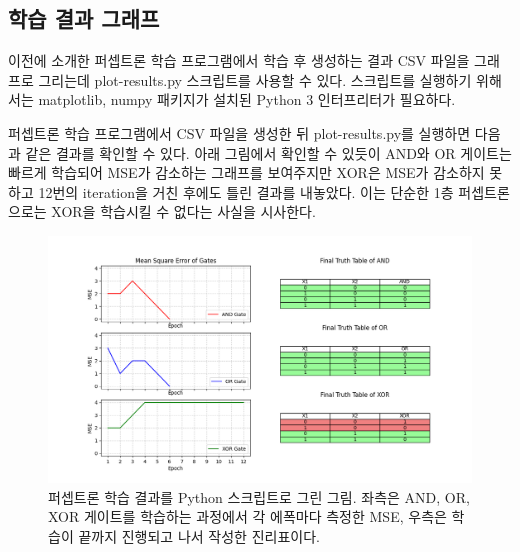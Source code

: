 \documentclass[letterpaper,10pt]{article}
\begin{document}
		\subsection{학습 결과 그래프}
		
			이전에 소개한 퍼셉트론 학습 프로그램에서 학습 후 생성하는 결과 CSV 파일을 그래프로 그리는데 plot-results.py 스크립트를 사용할 수 있다. 스크립트를 실행하기 위해서는 matplotlib, numpy 패키지가 설치된 Python 3 인터프리터가 필요하다.
			
			퍼셉트론 학습 프로그램에서 CSV 파일을 생성한 뒤 plot-results.py를 실행하면 다음과 같은 결과를 확인할 수 있다. 아래 그림에서 확인할 수 있듯이 AND와 OR 게이트는 빠르게 학습되어 MSE가 감소하는 그래프를 보여주지만 XOR은 MSE가 감소하지 못하고 12번의 iteration을 거친 후에도 틀린 결과를 내놓았다. 이는 단순한 1층 퍼셉트론으로는 XOR을 학습시킬 수 없다는 사실을 시사한다.
			
			\begin{figure}[h]
				\centering
				\includegraphics[width=0.9\linewidth]{images/Figure_1.png}
				\caption{퍼셉트론 학습 결과를 Python 스크립트로 그린 그림. 좌측은 AND, OR, XOR 게이트를 학습하는 과정에서 각 에폭마다 측정한 MSE, 우측은 학습이 끝까지 진행되고 나서 작성한 진리표이다.}
			\end{figure}
			
			
	
\end{document}
